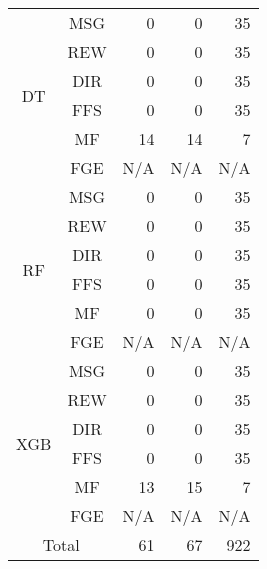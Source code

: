 \begin{table}[h!]
\begin{center}
\begin{tabular}{|c|c|r|r|r|}
                \multirow{6}{*}{DT} & MSG & 0 & 0 & 35 \\
                \cline{2-5}
                    & REW & 0 & 0 & 35 \\
                \cline{2-5}
                    & DIR & 0 & 0 & 35 \\
                \cline{2-5}
                    & FFS &  0 & 0 & 35 \\
                \cline{2-5}
                    & MF & 14 & 14 & 7 \\
                \cline{2-5}
                    & FGE & N/A & N/A & N/A \\
                \cline{1-5}

                \multirow{6}{*}{RF} & MSG & 0 & 0 & 35 \\
                \cline{2-5}
                    & REW & 0 & 0 & 35 \\
                \cline{2-5}
                    & DIR & 0 & 0 & 35 \\
                \cline{2-5}
                    & FFS &  0 & 0 & 35 \\
                \cline{2-5}
                    & MF & 0 & 0 & 35 \\
                \cline{2-5}
                    & FGE & N/A & N/A & N/A \\
                \cline{1-5}
                
                \multirow{6}{*}{XGB} & MSG & 0 & 0 & 35 \\
                \cline{2-5}
                    & REW & 0 & 0 & 35 \\
                \cline{2-5}
                    & DIR & 0 & 0 & 35 \\
                \cline{2-5}
                    & FFS &  0 & 0 & 35 \\
                \cline{2-5}
                    & MF & 13 & 15 & 7 \\
                \cline{2-5}
                    & FGE & N/A & N/A & N/A \\
                \cline{1-5}
                
                \multicolumn{2}{|c|}{Total} & 61 & 67 & 922 \\
                \hline
            \end{tabular}
    \end{center}
\end{table}